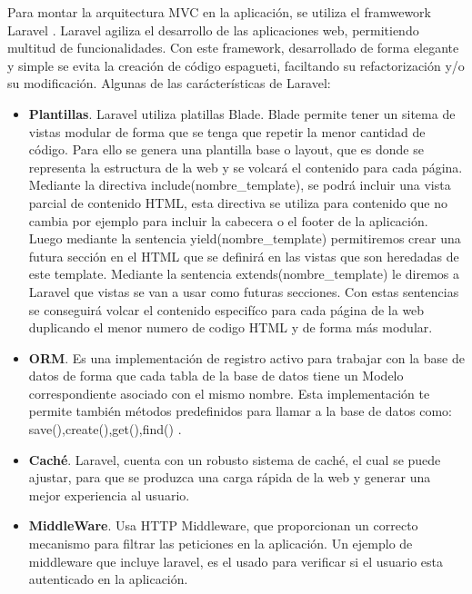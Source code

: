 \vspace{5 mm}

Para montar la arquitectura MVC en la aplicación, se utiliza el framwework Laravel \cite{laravel-doc}. Laravel agiliza el desarrollo de las aplicaciones web, permitiendo multitud de funcionalidades. Con este framework, desarrollado de forma elegante y simple se evita la creación de código espagueti, faciltando su refactorización y/o su modificación. Algunas de las carácterísticas de Laravel: 


\begin{itemize}

\item \textbf{Plantillas}. Laravel utiliza platillas Blade. Blade permite tener un sitema de vistas modular de forma que se tenga que repetir la menor cantidad de código. Para ello se genera una plantilla base o layout, que es donde se representa la estructura de la web y se volcará el contenido para cada página. Mediante la directiva include(nombre\_template), se podrá incluir una vista parcial de contenido HTML, esta directiva se utiliza para contenido que no cambia por ejemplo para incluir la cabecera o el footer de la aplicación. Luego mediante la sentencia yield(nombre\_template) permitiremos crear una futura sección en el HTML que se definirá en las vistas que son heredadas de este template. Mediante la sentencia extends(nombre\_template) le diremos a Laravel que vistas se van a usar como futuras secciones. Con estas sentencias se conseguirá volcar el contenido especifíco para cada página de la web duplicando el menor numero de codigo HTML y de forma más modular.

\item \textbf{ORM}. Es una implementación de registro activo para trabajar con la base de datos de forma que cada tabla de la base de datos tiene un Modelo correspondiente asociado con el mismo nombre. Esta implementación te permite también métodos predefinidos para llamar a la base de datos como: save(),create(),get(),find() \cite{eloquent-orm}.

\item \textbf{Caché}. Laravel, cuenta con un robusto sistema de caché, el cual se puede ajustar, para que se produzca una carga rápida de la web y generar una mejor experiencia al usuario.

\item \textbf{MiddleWare}. Usa HTTP Middleware, que proporcionan un correcto mecanismo para filtrar las peticiones en la aplicación. Un ejemplo de middleware que incluye laravel, es el usado para verificar si el usuario esta autenticado en la aplicación.

\end{itemize}

